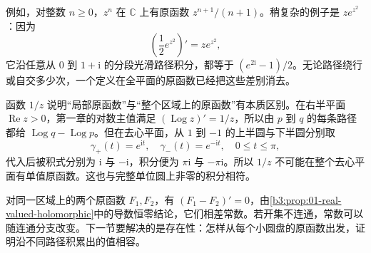 例如，对整数 \(n\ge0\)，\(z^n\) 在 \(\mathbb C\) 上有原函数 \(z^{n+1}/(n+1)\)。稍复杂的例子是 \(ze^{z^2}\)：因为
\[
 \left(\frac12e^{z^2}\right)'=ze^{z^2},
\]
它沿任意从 \(0\) 到 \(1+\mathrm{i}\) 的分段光滑路径积分，都等于 \((e^{2\mathrm{i}}-1)/2\)。无论路径绕行或自交多少次，一个定义在全平面的原函数已经把这些差别消去。

\ProseParagraphBreak

函数 \(1/z\) 说明“局部原函数”与“整个区域上的原函数”有本质区别。在右半平面 \(\operatorname{Re}z>0\)，第一章的对数主值满足 \((\operatorname{Log}z)'=1/z\)，所以由 \(p\) 到 \(q\) 的每条路径都给 \(\operatorname{Log}q-\operatorname{Log}p\)。但在去心平面，从 \(1\) 到 \(-1\) 的上半圆与下半圆分别取
\[
 \gamma_+(t)=e^{\mathrm{i}t},
 \quad \gamma_-(t)=e^{-\mathrm{i}t},
 \quad 0\le t\le\pi,
\]
代入后被积式分别为 \(\mathrm{i}\) 与 \(-\mathrm{i}\)，积分便为 \(\pi\mathrm{i}\) 与 \(-\pi\mathrm{i}\)。所以 \(1/z\) 不可能在整个去心平面有单值原函数。这也与完整单位圆上非零的积分相符。

\ProseParagraphBreak

对同一区域上的两个原函数 \(F_1,F_2\)，有 \((F_1-F_2)'=0\)，由\cref{b3:prop:01-real-valued-holomorphic}中的导数恒零结论，它们相差常数。若开集不连通，常数可以随连通分支改变。下一节要解决的是存在性：怎样从每个小圆盘的原函数出发，证明沿不同路径积累出的值相容。
